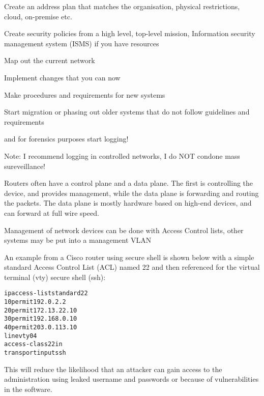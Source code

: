\documentclass[Screen16to9,17pt]{foils}
\begin{document}
\begin{list2}
\item Create an address plan that matches the organisation, physical restrictions, cloud, on-premise etc.
\item Create security policies from a high level, top-level mission, Information security management system (ISMS) if you have resources
\item Map out the current network
\item Implement changes that you can now
\item Make procedures and requirements for new systems
\item Start migration or phasing out older systems that do not follow guidelines and requirements
\end{list2}

and for forensics purposes start logging!


Note: I recommend logging in controlled networks, I do NOT condone mass sureveillance!



Routers often have a control plane and a data plane. The first is controlling the device, and provides
management, while the data plane is forwarding and routing the packets. The data plane is mostly hardware based on high-end devices, and can forward at full wire speed.


Management of network devices can be done with Access Control lists, other systems may be put into a management VLAN

An example from a Cisco router using secure shell is shown below with a simple standard Access Control List (ACL) named 22 and then referenced for the virtual terminal (vty) secure shell (ssh):

\begin{alltt}\scriptsize
ip access-list standard 22
10 permit 192.0.2.2
20 permit 172.13.22.10
30 permit 192.168.0.10
40 permit 203.0.113.10
line vty 0 4
  access-class 22 in
  transport input ssh
\end{alltt}

This will reduce the likelihood that an attacker can gain access to the administration using leaked username and passwords or because of vulnerabilities in the software.

\end{document}
